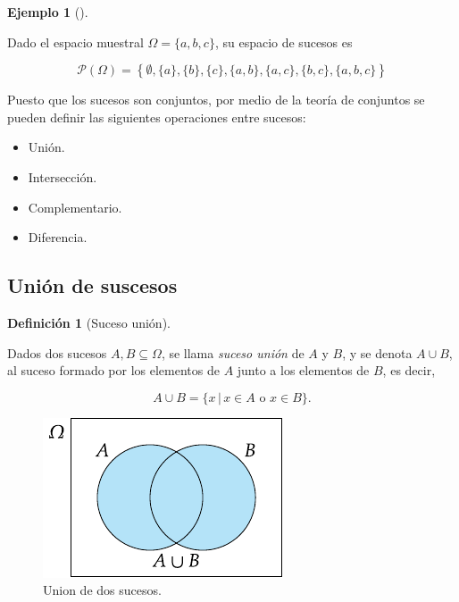 \documentclass[
  a4paper,
]{scrreport}
\providecommand{\tightlist}{%
  \setlength{\itemsep}{0pt}\setlength{\parskip}{0pt}}\usepackage{longtable,booktabs,array}
\theoremstyle{plain}
\theoremstyle{definition}
\newtheorem{definition}{Definición}[chapter]
\theoremstyle{definition}
\newtheorem{example}{Ejemplo}[chapter]
\theoremstyle{remark}
\begin{document}
\begin{example}[]\protect\hypertarget{exm-espacio-sucesos}{}\label{exm-espacio-sucesos}

Dado el espacio muestral \(\Omega=\{a,b,c\}\), su espacio de sucesos es

\[\mathcal{P}(\Omega)=\left\{\emptyset, \{a\},\{b\},\{c\},\{a,b\},\{a,c\},\{b,c\},\{a,b,c\}\right\}\]

\end{example}

Puesto que los sucesos son conjuntos, por medio de la teoría de
conjuntos se pueden definir las siguientes operaciones entre sucesos:

\begin{itemize}
\tightlist
\item
  Unión.
\item
  Intersección.
\item
  Complementario.
\item
  Diferencia.
\end{itemize}

\subsection{Unión de suscesos}\label{uniuxf3n-de-suscesos}

\begin{definition}[Suceso
unión]\protect\hypertarget{def-union-sucesos}{}\label{def-union-sucesos}

Dados dos sucesos \(A,B\subseteq \Omega\), se llama \emph{suceso unión}
de \(A\) y \(B\), y se denota \(A\cup B\), al suceso formado por los
elementos de \(A\) junto a los elementos de \(B\), es decir,

\[A\cup B = \{x\,|\, x\in A\mbox{ o }x\in B\}.\]

\end{definition}

\begin{figure}[H]

{\centering \includegraphics{img/probabilidad/union.pdf}

}

\caption{Union de dos sucesos.}

\end{figure}%
\end{document}
